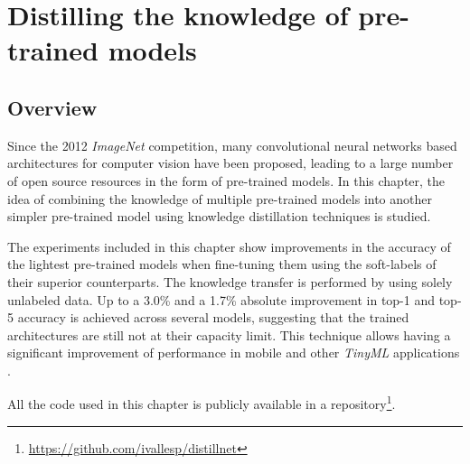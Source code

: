 \chapter{Distilling the knowledge of pre-trained models} \label{ch:distillation}
\section{Overview}
Since the 2012 \textit{ImageNet} competition, many convolutional neural networks based architectures for computer vision have been proposed, leading to a large number of open source resources in the form of pre-trained models. In this chapter, the idea of combining the knowledge of multiple pre-trained models into another simpler pre-trained model using knowledge distillation techniques is studied. 

The experiments included in this chapter show improvements in the accuracy of the lightest pre-trained models when fine-tuning them using the soft-labels of their superior counterparts. The knowledge transfer is performed by using solely unlabeled data. Up to a 3.0\% and a 1.7\% absolute improvement in top-1 and top-5 accuracy is achieved across several models, suggesting that the trained architectures are still not at their capacity limit. This technique allows having a significant improvement of performance in mobile and other \textit{TinyML} applications \autocite{sanchez2020}.

 All the code used in this chapter is publicly available in a repository\footnote{\url{https://github.com/ivallesp/distillnet}}.

